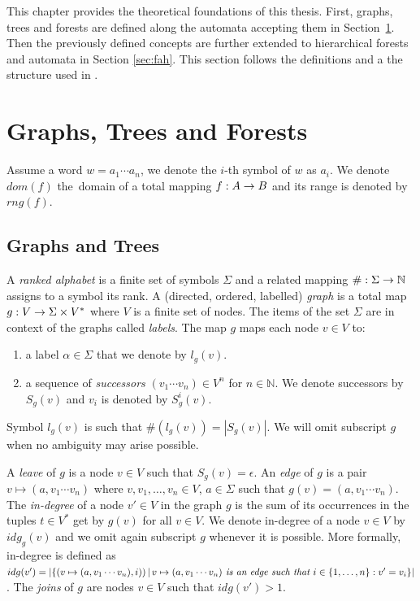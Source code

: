 This chapter provides the theoretical foundations of this thesis.
First, graphs, trees and forests are defined along the automata accepting them in Section~\ref{sec:graph}.
Then the previously defined concepts are further extended to hierarchical forests and automata in Section \ref{sec:fah}.
This section follows the definitions and a the structure used in \cite{techrep}.

\section{Graphs, Trees and Forests}
\label{sec:graph}

Assume a word $w = a_1 \cdots a_n$, we denote the $i$-th symbol of $w$ as $a_i$.
We denote $dom(f)$ the~domain of a total mapping $f: A \rightarrow B$ and its range is denoted by $rng(f)$.

\subsection{Graphs and Trees}
\label{subsec:graph}
A \emph{ranked alphabet} is a finite set of symbols $\Sigma$ and a related mapping $\#: \Sigma \rightarrow \mathbb{N}$
assigns to a symbol its rank.
A (directed, ordered, labelled) \emph{graph} is a total map $g: V \rightarrow \Sigma \times V^{*}$ where $V$ is a finite set of nodes.
The items of the set $\Sigma$ are in context of the graphs called \emph{labels}.
The map $g$ maps each node $v\in V$ to:
\begin{enumerate}
	\item a label $\alpha \in \Sigma$ that we denote by $l_g(v)$.
	\item a sequence of \emph{successors} $(v_1 \cdots v_n) \in V^n$ for $n \in \mathbb{N}$.
		We denote successors by $S_g(v)$ and $v_i$ is denoted by $S^i_g(v)$.
\end{enumerate}
Symbol $l_g(v)$ is such that $\#(l_g(v)) = |S_g(v)|$.
We will omit subscript $g$ when no ambiguity may arise possible.

A \emph{leave} of $g$ is a node $v \in V$ such that $S_g(v) = \epsilon$.
An \emph{edge} of $g$ is a pair $v \mapsto (a, v_1 \cdots v_n)$ where $v, v_1, \ldots, v_n \in V$,
$a \in \Sigma$ such that $g(v) = (a, v_1 \cdots v_n)$.
The \emph{in-degree} of a node $v' \in V$ in the graph $g$ is the sum of
its occurrences in the tuples $t \in V^{*}$ get by $g(v)$ for all $v \in V$.
We denote in-degree of a node $v \in V$ by $idg_g(v)$ and
we omit again subscript $g$ whenever it is possible.
More formally, in-degree is defined as
$idg(v') = |\{(v \mapsto (a, v_1 \cdots v_n),i)) \,|\, v \mapsto (a, v_1 \cdots v_n)
\emph{ is an edge such that } i \in \{1,\ldots,n\}: v' = v_i\}|$.
The \emph{joins} of $g$ are nodes $v \in V$ such that $idg(v') > 1$.

